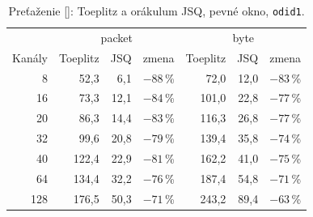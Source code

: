 \begin{table}[ht]
  \centering
  \small
  \caption{Preťaženie [\textperthousand]: Toeplitz a orákulum JSQ, pevné okno, \texttt{odid1}.}
  \label{tab:jsq}
  \begin{tabular}{r rrr rrr}
    \toprule
    & \multicolumn{3}{c}{packet} & \multicolumn{3}{c}{byte} \\
    Kanály & Toeplitz & JSQ & zmena & Toeplitz & JSQ & zmena \\
    \midrule
    8 & 52,3 & 6,1 & $-88$\,\% & 72,0 & 12,0 & $-83$\,\% \\
    16 & 73,3 & 12,1 & $-84$\,\% & 101,0 & 22,8 & $-77$\,\% \\
    20 & 86,3 & 14,4 & $-83$\,\% & 116,3 & 26,8 & $-77$\,\% \\
    32 & 99,6 & 20,8 & $-79$\,\% & 139,4 & 35,8 & $-74$\,\% \\
    40 & 122,4 & 22,9 & $-81$\,\% & 162,2 & 41,0 & $-75$\,\% \\
    64 & 134,4 & 32,2 & $-76$\,\% & 187,4 & 54,8 & $-71$\,\% \\
    128 & 176,5 & 50,3 & $-71$\,\% & 243,2 & 89,4 & $-63$\,\% \\
    \bottomrule
  \end{tabular}
\end{table}
